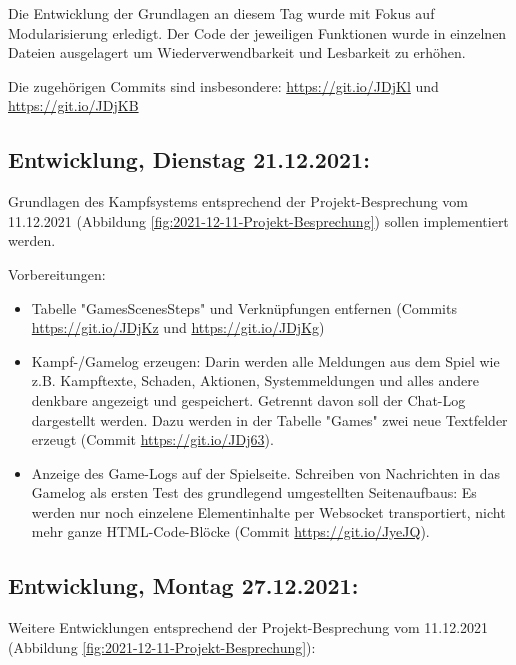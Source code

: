 Die Entwicklung der Grundlagen an diesem Tag wurde mit Fokus auf Modularisierung erledigt. Der Code der jeweiligen Funktionen wurde in einzelnen Dateien ausgelagert um Wiederverwendbarkeit und Lesbarkeit zu erhöhen. 

Die zugehörigen Commits sind insbesondere: 
\url{https://git.io/JDjKl} und 
\url{https://git.io/JDjKB}


\subsection{Entwicklung, Dienstag 21.12.2021:}

Grundlagen des Kampfsystems entsprechend der Projekt-Besprechung vom 11.12.2021 (Abbildung \ref{fig:2021-12-11-Projekt-Besprechung}) sollen implementiert werden.

Vorbereitungen: 

\begin{itemize}
    \item Tabelle "GamesScenesSteps" und Verknüpfungen entfernen (Commits \url{https://git.io/JDjKz} und \url{https://git.io/JDjKg})
    \item Kampf-/Gamelog erzeugen: Darin werden alle Meldungen aus dem Spiel wie z.B. Kampftexte, Schaden, Aktionen, Systemmeldungen und alles andere denkbare angezeigt und gespeichert. Getrennt davon soll der Chat-Log dargestellt werden. Dazu werden in der Tabelle "Games" zwei neue Textfelder erzeugt (Commit \url{https://git.io/JDj63}). 
    \item Anzeige des Game-Logs auf der Spielseite. Schreiben von Nachrichten in das Gamelog als ersten Test des grundlegend umgestellten Seitenaufbaus: Es werden nur noch einzelene Elementinhalte per Websocket transportiert, nicht mehr ganze HTML-Code-Blöcke (Commit \url{https://git.io/JyeJQ}).
\end{itemize}


\subsection{Entwicklung, Montag 27.12.2021:}

Weitere Entwicklungen entsprechend der Projekt-Besprechung vom 11.12.2021 (Abbildung \ref{fig:2021-12-11-Projekt-Besprechung}):

